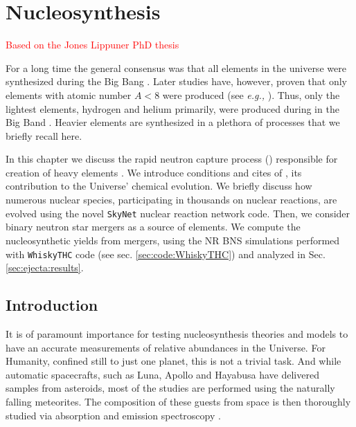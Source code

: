 
\chapter{Nucleosynthesis} %

\label{ch:nucleo} %

\textcolor{red}{Based on the Jones Lippuner PhD thesis}

For a long time the general consensus was that all elements in the universe were synthesized during the Big Bang \citep{Alpher:1948}. Later studies have, however, proven that only elements with atomic number $A<8$ were produced (see \textit{e.g.,} \citet{Alpher:1950,Shaviv:2012}). Thus, only the lightest elements, hydrogen and helium primarily, were produced during in the Big Band \citep{Burbidge:1957}. Heavier elements are synthesized in a plethora of processes that we briefly recall here.

In this chapter we discuss the rapid neutron capture process (\rproc{}) responsible for creation of heavy elements \cite{Burbidge:1957}. We introduce conditions and cites of \rproc{}, its contribution to the Universe' chemical evolution. We briefly discuss how numerous nuclear species, participating in thousands on nuclear reactions, are evolved using the novel \texttt{SkyNet} nuclear reaction network code. Then, we consider binary neutron star mergers as a source of \rproc{} elements. We compute the nucleosynthetic yields from mergers, using the \ac{NR} \ac{BNS} simulations performed with \texttt{WhiskyTHC} code (see sec. \ref{sec:code:WhiskyTHC}) and analyzed in Sec.\ref{sec:ejecta:results}.


\section{Introduction}

It is of paramount importance for testing nucleosynthesis theories and models to have an accurate measurements of relative abundances in the Universe. For Humanity, confined still to just one planet, this is not a trivial task. And while automatic spacecrafts, such as Luna, Apollo and Hayabusa have delivered samples from asteroids, most of the studies are performed using the naturally falling meteorites. The composition of these guests from space is then thoroughly studied via absorption and emission spectroscopy \citep{Shaviv:2012}.

